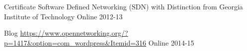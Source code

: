 

\begin{cvhonors}

  \cvhonor
    {Certificate} %
    {Software Defined Networking (SDN) with Distinction from Georgia Institute of Technology}
    {Online} %
    {2012-13} %

  \cvhonor
    {Blog} %
    {\url{https://www.opennetworking.org/?p=1417&option=com_wordpress&Itemid=316}} %
    {Online} %
    {2014-15} %

\end{cvhonors}
